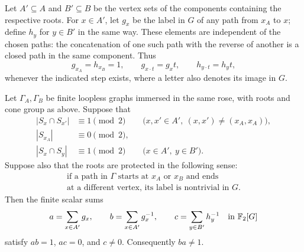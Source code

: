 Let $A'\subseteq A$ and $B'\subseteq B$ be the vertex sets of the
components containing the respective roots.  For $x\in A'$, let $g_x$
be the label in $G$ of any path from $x_A$ to $x$; define $h_y$ for
$y\in B'$ in the same way.  These elements are independent of the
chosen paths: the concatenation of one such path with the reverse of
another is a closed path in the same component.  Thus
\begin{equation}\label{eq:path-step}
 g_{x_A}=h_{x_B}=1,\qquad
 g_{x\cdot t}=g_x t,\qquad h_{y\cdot t}=h_y t,
\end{equation}
whenever the indicated step exists, where a letter also denotes its
image in $G$.

\begin{proposition}\label{prop:parity}
Let $\Gamma_A,\Gamma_B$ be finite loopless graphs immersed in the same
rose, with roots and cone group as above.  Suppose that
\begin{equation}\label{eq:parity-assumptions}
 \begin{aligned}
 |S_x\cap S_{x'}|&\equiv1\pmod2
   &&\bigl(x,x'\in A',\ (x,x')\ne(x_A,x_A)\bigr),\\
 |S_{x_A}|&\equiv0\pmod2,\\
 |S_x\cap S_y|&\equiv1\pmod2
   &&\bigl(x\in A',\ y\in B'\bigr).
 \end{aligned}
\end{equation}
Suppose also that the roots are protected in the following sense:
\begin{equation}\label{eq:root-protection}
 \begin{gathered}
 \text{if a path in $\Gamma$ starts at $x_A$ or $x_B$ and ends}\\[-2pt]
 \text{at a different vertex, its label is nontrivial in $G$.}
 \end{gathered}
\end{equation}
Then the finite scalar sums
\begin{equation}\label{eq:scalar-elements}
 a=\sum_{x\in A'}g_x,\qquad
 b=\sum_{x\in A'}g_x^{-1},\qquad
 c=\sum_{y\in B'}h_y^{-1}
 \quad\text{in }\mathbb F_2[G]
\end{equation}
satisfy $ab=1$, $ac=0$, and $c\ne0$.  Consequently $ba\ne1$.
\end{proposition}

